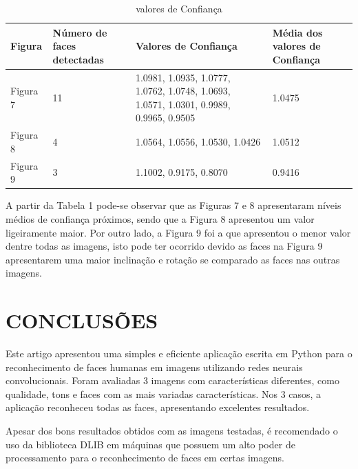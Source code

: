\documentclass[conference]{IEEEtran}
\begin{document}
		\begin{table}[h!b]
		\caption{valores de Confiança}
		\label{table}
		\setlength{\tabcolsep}{4pt}
		\begin{tabular}{|p{30pt}|p{50pt}|p{90pt}|p{50pt}|}
			\hline
				Figura & Número de faces detectadas & Valores de Confiança & Média dos valores de Confiança\\
			\hline
				Figura 7 & 11 & 1.0981, 1.0935, 1.0777, 1.0762, 1.0748, 1.0693, 1.0571, 1.0301, 0.9989, 0.9965, 0.9505 				& 1.0475 \\
			\hline
				Figura 8 & 4 & 1.0564, 1.0556, 1.0530, 1.0426 & 1.0512\\ 
			\hline
				Figura 9 & 3 & 1.1002, 0.9175, 0.8070 & 0.9416\\ 
			\hline
		\end{tabular}
		\label{tab1}
		\end{table}        
          
          A partir da Tabela 1 pode-se observar que as Figuras 7 e 8 apresentaram níveis médios de confiança próximos, sendo que a Figura 8 apresentou um valor ligeiramente maior. Por outro lado, a Figura 9 foi a que apresentou o menor valor dentre todas as imagens, isto pode ter ocorrido devido as faces na Figura 9 apresentarem uma maior inclinação e rotação se comparado as faces nas outras imagens.
	
	\section{CONCLUSÕES}
         Este artigo apresentou uma simples e eficiente aplicação escrita em Python para o reconhecimento de faces humanas em imagens utilizando redes neurais convolucionais. Foram avaliadas 3 imagens com características diferentes, como qualidade, tons e faces com as mais variadas características. Nos 3 casos, a aplicação reconheceu todas as faces, apresentando excelentes resultados. 
        
         Apesar dos bons resultados obtidos com as imagens testadas, é recomendado o uso da biblioteca DLIB em máquinas que possuem um alto poder de processamento para o reconhecimento de faces em certas imagens.
      
\end{document}

